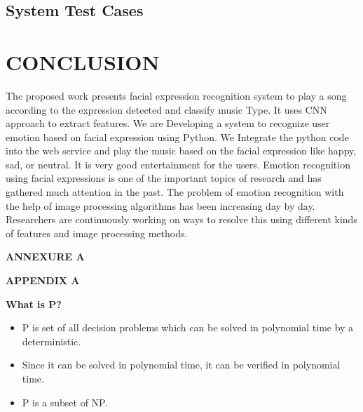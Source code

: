 \documentclass[12pt]{report}
\begin{document}
\vspace{1cm}
\clearpage

\subsection{System Test Cases}

\vspace{1cm}
\clearpage


\centering
\section{CONCLUSION }
\justifying
\setlength{\parindent}{4em}
\setlength{\parskip}{0.5em}
\renewcommand{\baselinestretch}{1.5}
\normalsize

\hspace{1.7cm}The proposed work presents facial expression recognition system to play a song according 
to the expression detected and classify music Type. It uses CNN approach to extract features. We 
are Developing a system to recognize user emotion based on facial expression using Python. We 
Integrate the python code into the web service and play the music based on the facial expression 
like happy, sad, or neutral. It is very good entertainment for the users. Emotion recognition using 
facial expressions is one of the important topics of research and has gathered much attention in the 
past. The problem of emotion recognition with the help of image processing algorithms has been 
increasing day by day. Researchers are continuously working on ways to resolve this using different 
kinds of features and image processing methods.\\
\vspace{15cm}


\centering
\Large\textbf{ANNEXURE A }

\centering

\Large\textbf{APPENDIX A}\\
\justifying
\setlength{\parindent}{4em}
\setlength{\parskip}{0.5em}
\renewcommand{\baselinestretch}{1.5}
\normalsize
\raggedright\textbf{What is P?}
\begin{itemize}
\item P is set of all decision problems which can be solved in polynomial time by a
deterministic.\\
\item  Since it can be solved in polynomial time, it can be verified in polynomial time.\\
\item  P is a subset of NP.
\end{itemize}
\end{document}
